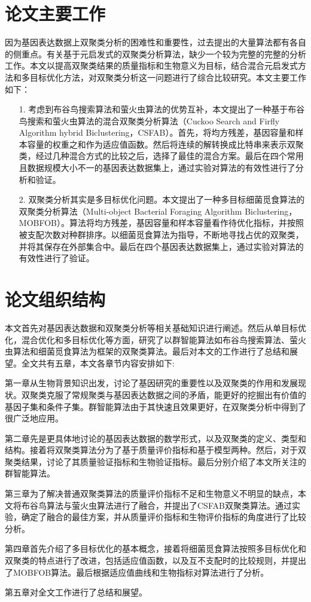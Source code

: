 \section{论文主要工作}
    因为基因表达数据上双聚类分析的困难性和重要性，过去提出的大量算法都有各自的侧重点。有关基于元启发式的双聚类分析算法，缺少一个较为完整的完整的分析工作。本文以提高双聚类结果的质量指标和生物意义为目标，结合混合元启发式方法和多目标优化方法，对双聚类分析这一问题进行了综合比较研究。本文主要工作如下：
    \begin{itemize}
       \item[1.] {考虑到布谷鸟搜索算法和萤火虫算法的优势互补，本文提出了一种基于布谷鸟搜索和萤火虫算法的混合双聚类分析算法（Cuckoo Search and Firfly Algorithm hybrid Biclustering，CSFAB）。首先，将均方残差，基因容量和样本容量的权重之和作为适应值函数。然后将连续的解转换成比特串来表示双聚类，经过几种混合方式的比较之后，选择了最佳的混合方案。最后在四个常用且数据规模大小不一的基因表达数据集上，通过实验对算法的有效性进行了分析和验证。}

       \item[2.] {双聚类分析其实是多目标优化问题。本文提出了一种多目标细菌觅食算法的双聚类分析算法（Multi-object Bacterial Foraging Algorithm Biclustering，MOBFOB）。算法将均方残差，基因容量和样本容量看作待优化指标，并按照被支配次数对种群排序。以细菌觅食算法为指导，不断地寻找占优的双聚类，并将其保存在外部集合中。最后在四个基因表达数据集上，通过实验对算法的有效性进行了验证。}
       
    \end{itemize}

\section{论文组织结构}
    本文首先对基因表达数据和双聚类分析等相关基础知识进行阐述。然后从单目标优化，混合优化和多目标优化等方面，研究了以群智能算法如布谷鸟搜索算法、萤火虫算法和细菌觅食算法为框架的双聚类算法。最后对本文的工作进行了总结和展望。全文共有五章，本文各章节内容安排如下:

    第一章从生物背景知识出发，讨论了基因研究的重要性以及双聚类的作用和发展现状。双聚类克服了常规聚类与基因表达数据之间的矛盾，能更好的挖掘出有价值的基因子集和条件子集。群智能算法由于其快速且效果更好，在双聚类分析中得到了很广泛地应用。

    第二章先是更具体地讨论的基因表达数据的数学形式，以及双聚类的定义、类型和结构。接着将双聚类算法分为了基于质量评价指标和基于模型两种。然后，对于双聚类结果，讨论了其质量验证指标和生物验证指标。最后分别介绍了本文所关注的群智能算法。

    第三章为了解决普通双聚类算法的质量评价指标不足和生物意义不明显的缺点，本文将布谷鸟算法与萤火虫算法进行了融合，并提出了CSFAB双聚类算法。通过实验，确定了融合的最佳方案，并从质量评价指标和生物评价指标的角度进行了比较分析。

    第四章首先介绍了多目标优化的基本概念，接着将细菌觅食算法按照多目标优化和双聚类的特点进行了改进，包括适应值函数，以及互不支配时的比较规则，并提出了MOBFOB算法。最后根据适应值曲线和生物指标对算法进行了分析。
    
    第五章对全文工作进行了总结和展望。
